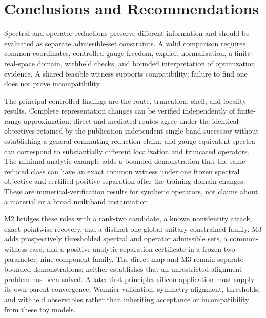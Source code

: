 \documentclass[preprint,12pt]{elsarticle}
\begin{document}
\section{Conclusions and Recommendations}
\label{sec:conclusions}

Spectral and operator reductions preserve different information and should be
evaluated as separate admissible-set constraints. A valid comparison requires
common coordinates, controlled gauge freedom, explicit normalization, a finite
real-space domain, withheld checks, and bounded interpretation of optimization
evidence. A shared feasible witness supports compatibility; failure to find
one does not prove incompatibility.

The principal controlled findings are the route, truncation, shell, and
locality results. Complete representation changes can be verified independently
of finite-range approximation; direct and mediated routes agree under the
identical objectives retained by the publication-independent single-band successor
without establishing a general commuting-reduction claim; and gauge-equivalent spectra can correspond to
substantially different localization and truncated operators.
The minimal analytic example adds a bounded demonstration that the same reduced
class can have an exact common witness under one frozen spectral objective and
certified positive separation after the training domain changes. These are
numerical-verification results for synthetic operators, not claims about a
material or a broad multiband instantiation.

M2 bridges these roles with a rank-two candidate, a known nonidentity attack,
exact pointwise recovery, and a distinct one-global-unitary constrained family.
M3 adds prospectively thresholded spectral and operator admissible sets, a
common-witness case, and a positive analytic separation certificate in a frozen
two-parameter, nine-component family. The direct map and M3 remain separate
bounded demonstrations; neither establishes that an unrestricted alignment
problem has been solved. A later first-principles silicon application must supply its own parent
convergence, Wannier validation, symmetry alignment, thresholds, and withheld
observables rather than inheriting acceptance or incompatibility from these toy
models.

\appendix


\clearpage

\clearpage

\clearpage

\clearpage

\clearpage

\end{document}
